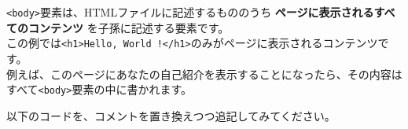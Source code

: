\texttt{\textless{}body\textgreater{}}要素は、HTMLファイルに記述するもののうち
\textbf{ページに表示されるすべてのコンテンツ}
を子孫に記述する要素です。\\
この例では\texttt{\textless{}h1\textgreater{}Hello,\ World\ !\textless{}/h1\textgreater{}}のみがページに表示されるコンテンツです。\\
例えば、このページにあなたの自己紹介を表示することになったら、その内容はすべて\texttt{\textless{}body\textgreater{}}要素の中に書かれます。

以下のコードを、コメントを置き換えつつ追記してみてください。

\begin{Shaded}
\begin{Highlighting}[]
  \DataTypeTok{\textless{}}\DataTypeTok{\textgreater{}}
    \DataTypeTok{\textless{}}\DataTypeTok{\textgreater{}}\DataTypeTok{\textless{}/}\DataTypeTok{\textgreater{}}
    \DataTypeTok{\textless{}}\DataTypeTok{\textgreater{}}\DataTypeTok{\textless{}/}\DataTypeTok{\textgreater{}}
    \DataTypeTok{\textless{}}\DataTypeTok{\textgreater{}}
      \DataTypeTok{\textless{}}\DataTypeTok{\textgreater{}}\DataTypeTok{\textless{}}\DataTypeTok{\textgreater{}}\DataTypeTok{\textless{}/}\DataTypeTok{\textgreater{}\textless{}/}\DataTypeTok{\textgreater{}}
      \DataTypeTok{\textless{}}\DataTypeTok{\textgreater{}}\DataTypeTok{\textless{}/}\DataTypeTok{\textgreater{}}
      \DataTypeTok{\textless{}}\DataTypeTok{\textgreater{}}
        \DataTypeTok{\textless{}}\DataTypeTok{\textgreater{}}
          \DataTypeTok{\textless{}}\DataTypeTok{\textgreater{}}\DataTypeTok{\textless{}/}\DataTypeTok{\textgreater{}}
          \DataTypeTok{\textless{}}\DataTypeTok{\textgreater{}}\DataTypeTok{\textless{}/}\DataTypeTok{\textgreater{}}
          \DataTypeTok{\textless{}}\DataTypeTok{\textgreater{}}\DataTypeTok{\textless{}/}\DataTypeTok{\textgreater{}}
        \DataTypeTok{\textless{}/}\DataTypeTok{\textgreater{}}
      \DataTypeTok{\textless{}/}\DataTypeTok{\textgreater{}}
    \DataTypeTok{\textless{}/}\DataTypeTok{\textgreater{}}
  \DataTypeTok{\textless{}/}\DataTypeTok{\textgreater{}}
\end{Highlighting}
\end{Shaded}

